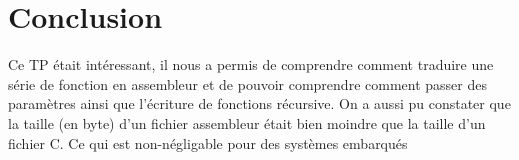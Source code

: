  
\section{Conclusion}
Ce TP était intéressant, il nous a permis de comprendre comment traduire une série de fonction en assembleur et de pouvoir comprendre comment passer des paramètres ainsi que l'écriture de fonctions récursive.
On a aussi pu constater que la taille (en byte) d'un fichier assembleur était bien moindre que la taille d'un fichier C. Ce qui est non-négligable pour des systèmes embarqués



